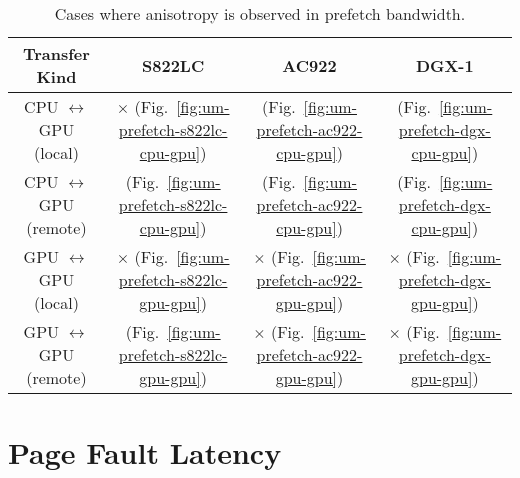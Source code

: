 \begin{table}[ht]
	\centering
	\caption[Anisotropy in Prefetch Bandwidth]{
		Cases where anisotropy is observed in prefetch bandwidth.
	}
	\label{tab:um-prefetch-anisotropy}
	\begin{tabular}{cccc}
		\hline
		\textbf{Transfer Kind}             & \textbf{S822LC}                                        & \textbf{AC922}                                        & \textbf{DGX-1}                                      \\ \hline 
		CPU $\leftrightarrow$ GPU (local)  & $\times$   (Fig.~\ref{fig:um-prefetch-s822lc-cpu-gpu}) & \checkmark (Fig.~\ref{fig:um-prefetch-ac922-cpu-gpu}) & \checkmark (Fig.~\ref{fig:um-prefetch-dgx-cpu-gpu}) \\ \hline
		CPU $\leftrightarrow$ GPU (remote) & \checkmark (Fig.~\ref{fig:um-prefetch-s822lc-cpu-gpu}) & \checkmark (Fig.~\ref{fig:um-prefetch-ac922-cpu-gpu}) & \checkmark (Fig.~\ref{fig:um-prefetch-dgx-cpu-gpu}) \\ \hline
		GPU $\leftrightarrow$ GPU (local)  & $\times$   (Fig.~\ref{fig:um-prefetch-s822lc-gpu-gpu}) & $\times$   (Fig.~\ref{fig:um-prefetch-ac922-gpu-gpu}) & $\times$ (Fig.~\ref{fig:um-prefetch-dgx-gpu-gpu})   \\ \hline
		GPU $\leftrightarrow$ GPU (remote) & \checkmark (Fig.~\ref{fig:um-prefetch-s822lc-gpu-gpu}) & $\times$   (Fig.~\ref{fig:um-prefetch-ac922-gpu-gpu}) & $\times$ (Fig.~\ref{fig:um-prefetch-dgx-gpu-gpu})   \\ \hline
	\end{tabular}
\end{table}

%
%
%
\section{Page Fault Latency}
\label{sec:um-page-fault}


